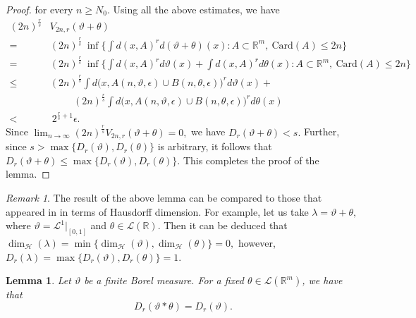 \documentclass{amsproc}
\newtheorem{lemma}[theorem]{Lemma}
\theoremstyle{definition}
\theoremstyle{remark}
\newtheorem{remark}[theorem]{Remark}
\numberwithin{equation}{section}
\newcommand{\ep}{\epsilon}
\begin{document}
\begin{proof}
 for every $n \ge N_0.$ 
 Using all the above estimates, we have
 \begin{equation*}
  \begin{aligned}
  (2n)^{\frac{r}{s}}& V_{2n,r}(\vartheta+\theta)\\= & (2n)^{\frac{r}{s}}~ \inf \Big\{\int d(x, A)^r d(\vartheta+\theta)(x): A \subset \mathbb{R}^m,~ \text{Card}(A) \le 2n\Big\}\\  = & (2n)^{\frac{r}{s}} ~\inf \Big\{\int d(x, A)^r d\vartheta(x)+\int d(x, A)^r d\theta(x): A \subset \mathbb{R}^m,~ \text{Card}(A) \le 2n\Big\}\\  \le  & (2n)^{\frac{r}{s}} \int d\Big(x, A(n,\vartheta,\ep) \cup B(n,\theta,\ep)\Big)^r d\vartheta(x)+ \\& \hspace{1cm}(2n)^{\frac{r}{s}}\int d\Big(x, A(n,\vartheta,\ep) \cup B(n,\theta,\ep)\Big)^r d\theta(x)\\ < & ~2^{\frac{r}{s}+1} \ep.
  \end{aligned}
  \end{equation*}
  Since $\lim_{n \to \infty} (2n)^{\frac{r}{s}} V_{2n,r}(\vartheta+\theta)=0,$ we have $D_r(\vartheta+\theta) < s.$ Further, since $s > \max\{D_r(\vartheta),D_r(\theta)\}$ is arbitrary, it follows that $D_r(\vartheta+\theta) \le \max\{D_r(\vartheta),D_r(\theta)\}.$ This completes the proof of the lemma.
 \end{proof}
 \begin{remark}
 The result of the above lemma can be compared to those that appeared in \cite{Mat3} in terms of Hausdorff dimension. For example, let us take $\lambda= \vartheta + \theta,$ where $\vartheta=\mathcal{L}^1|_{[0,1]}$ and $ \theta \in \mathcal{L}(\mathbb{R}).$ Then it can be deduced that $\dim_\mathcal{H}(\lambda)=\min\{\dim_\mathcal{H}(\vartheta),\dim_\mathcal{H}(\theta)\}=0,$ however, $D_r(\lambda)=\max\{D_r(\vartheta), D_r(\theta)\}=1.$ 
 \end{remark}
\begin{lemma}\label{lipdim1}
 Let $\vartheta$ be a finite Borel measure. For a fixed $\theta \in \mathcal{L}(\mathbb{R}^m)$, we have that 
 \[
 D_r(\vartheta*\theta) =D_r(\vartheta).
 \]
  \end{lemma}
\end{document}
